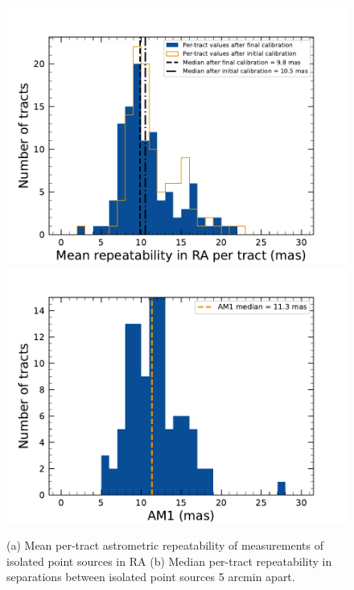 \begin{figure}[htb!]
\centering
\includegraphics[scale=0.29]{figures/Astrometry_dmAstroErr.pdf}
\includegraphics[scale=0.29]{figures/Astrometry_AM1.pdf}
\caption{(a) Mean per-tract astrometric repeatability of measurements of isolated point sources in \gls{RA} (b) Median per-tract repeatability in separations
between isolated point sources 5 \gls{arcmin} apart.}
\label{fig:AM1_and_dm_astro_error}
\end{figure}

